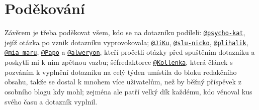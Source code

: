 \documentclass[12pt, a4paper, twoside]{article}
\makeatletter
\newcommand{\suser}[1]{\href{https://www.signaly.cz/#1}{\texttt{@#1}}}
\makeatother
\begin{document}
\section*{Poděkování}

Závěrem je třeba poděkovat všem, kdo se na dotazníku podíleli:
\suser{psycho-kat}, jejíž otázka po 
vznik dotazníku vyprovokovala;
\suser{JiKu}, \suser{slu-nicko}, \suser{plihalik}, \suser{mia-maru},
\suser{Papo} a \suser{alweryon}, kteří pročetli otázky před spuštěním
dotazníku a poskytli mi k nim zpětnou vazbu;
šéfredaktorce \suser{Kollenka}, která článek s pozváním k vyplnění
dotazníku na celý týden umístila do bloku redakčního obsahu,
takže se dostal
k mnohem více uživatelům, než by běžný příspěvek z osobního blogu
kdy mohl;
zejména ale patří velký dík každému, kdo věnoval kus svého času
a dotazník vyplnil.

\tableofcontents

\printbibliography
\end{document}
